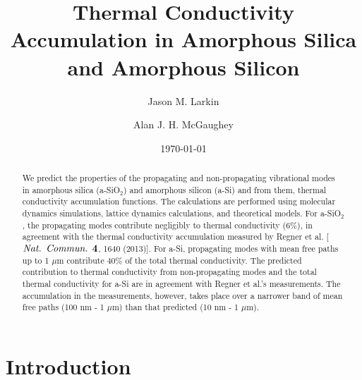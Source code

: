 \documentclass[aps,prb,onecolumn,preprint,superscriptaddress,footinbib,amsmath,amssymb,floatfix]{revtex4}
\begin{document}
\title{Thermal Conductivity 
Accumulation in Amorphous Silica and Amorphous Silicon}
\author{Jason M. Larkin}
\author{Alan J. H. McGaughey}

\date{\today}
\begin{abstract}
We predict the properties of the propagating and non-propagating 
vibrational modes in amorphous silica (a-SiO$_2$) and amorphous silicon 
(a-Si) and from them, thermal conductivity accumulation functions. 
The calculations are performed using molecular dynamics simulations, 
lattice dynamics calculations, and theoretical models. For a-SiO$_2$, 
the propagating modes contribute negligibly to thermal conductivity 
(6$\%$), in 
agreement with the thermal conductivity accumulation measured by 
Regner et al. [$\emph{Nat. Commun.}$ $\bf{4}$, 1640 (2013)]. 
For a-Si, propagating modes 
with mean free paths up to 1 $\mu$m contribute 40$\%$ of the total 
thermal 
conductivity. The predicted contribution to thermal conductivity from 
non-propagating modes and the total thermal conductivity for a-Si are in 
agreement with Regner et al.'s measurements. The accumulation in the 
measurements, however, takes place over a narrower band of 
mean free paths (100 nm - 1 $\mu$m) than that predicted 
(10 nm - 1 $\mu$m).
\end{abstract}
\maketitle
\section{\label{S:Introduction}Introduction}
\end{document}
